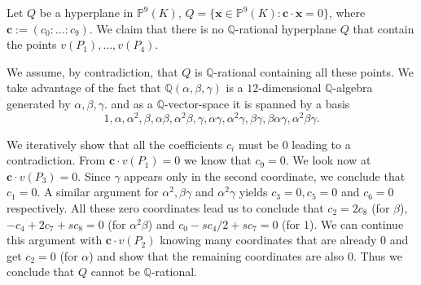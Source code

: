 \documentclass[a4paper,11pt]{amsart}%
\newcommand{\comment}[1]{}
\newcommand{\vSmall}{\vspace{3mm}\noindent}
\newcommand\Q{\mathbb{Q}}
\renewcommand\P{\mathbb{P}}
\theoremstyle{definition}
\begin{document}
\comment{
\begin{align*}
v(P_1)&=(0:0:0:0:0:0:0:1:0:0)\\
v(P_2)&=(0:0:0:0:4\alpha^2:-2s:4\alpha:s\alpha:-2\alpha^2:4)\\
v(P_3)&=(\gamma^2:\beta\gamma:-\alpha^2\gamma-\alpha\beta\gamma:\alpha\gamma:\beta^2:\alpha^2\beta-
\alpha-2\beta\\
&:\alpha\beta:s\alpha+\alpha^2+2\alpha\beta:-s-\alpha^2\beta:\alpha^2)\\
v(P_4)&=(\gamma^2:-\beta\gamma:\alpha^2\gamma+\alpha\beta\gamma:-\alpha\gamma:\beta^2:\alpha^2\beta-
\alpha-2\beta\\
&:\alpha\beta:s\alpha+\alpha^2+2\alpha\beta:-s-\alpha^2\beta:\alpha^2)
\end{align*}
where we know that
\begin{align*}
\gamma^2 &= -\frac{1}{2}-\beta\alpha^{-1} = -\frac{1}{2}-\frac{\beta\alpha^2}{s},\\
\beta^2 &= 1-2\beta(\alpha-\alpha^{-1}) = 1-2\beta\left(\alpha-\frac{\alpha^2}{s}\right).
\end{align*}
}

\vSmall
Let $Q$ be a hyperplane in $\P^9(K)$, $Q = \{\bm{x} \in \P^9(K) : \bm{c} \cdot \bm{x} = 0\}$, where $\bm{c}:=(c_0:\ldots:c_9)$. We claim that there is no $\Q$-rational hyperplane $Q$ that contain the points $v(P_1),\dots, v(P_4)$.

We assume, by contradiction, that $Q$ is $\Q$-rational containing all these points.
We take advantage of the fact that $\Q(\alpha,\beta,\gamma)$ is a $12$-dimensional
$\Q$-algebra generated by $\alpha,\beta,\gamma$.
and as a $\Q$-vector-space it is spanned by a basis
$$1,\alpha,\alpha^2, \beta,\alpha\beta,\alpha^2\beta,\gamma,\alpha\gamma,\alpha^2\gamma,\beta\gamma,\beta\alpha\gamma,\alpha^2\beta\gamma.$$

We iteratively show that all the coefficients $c_i$ must be $0$ leading to a contradiction. From $\bm{c}\cdot v(P_1) = 0$ we know that $c_9=0$. We look now at $\bm{c}\cdot v(P_3) = 0$.
Since $\gamma$ appears only in the second coordinate, we conclude that $c_1=0$. A similar argument for $\alpha^2,\beta\gamma$ and $\alpha^2\gamma$ yields $c_3=0,c_5=0$ and $c_6=0$ respectively.
All these zero coordinates lead us to conclude that $c_2=2c_8$ (for $\beta$), $-c_4+2c_7+sc_8=0$ (for $\alpha^2\beta$) and $c_0-sc_4/2+sc_7=0$ (for $1$). We can continue this argument with 
$\bm{c}\cdot v(P_2)$ knowing many coordinates that are already $0$ and get
$c_2=0$ (for $\alpha$) and show that the remaining coordinates are also $0$. Thus we conclude that $Q$ cannot be $\Q$-rational.
\end{document}
